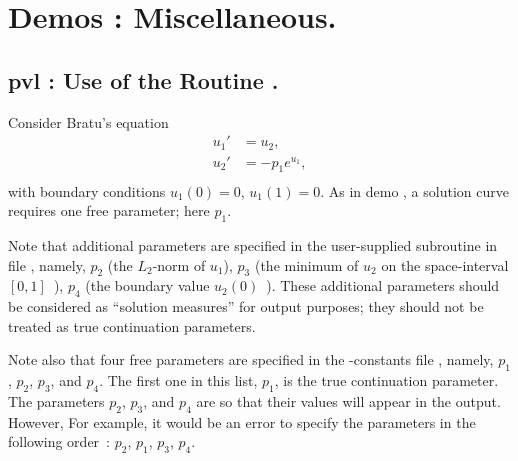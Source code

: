 \documentclass[12pt]{report}
\begin{document}
\chapter{ \AUTO Demos : Miscellaneous.} \label{ch:Demos_Misc}

\newpage
\section{ pvl : Use of the Routine .} \label{sec:Demos_pvl}

Consider Bratu's equation
\begin{equation} \begin{array}{cl}
  u_1 ' &= u_2  ,  \\
  u_2 ' &= -p_1  e^{u_1} , \\ 
\end{array} \end{equation}
with boundary conditions $ u_1(0)=0$, $u_1(1)=0.$
As in demo , a solution curve requires one free parameter;
here $p_1$.

Note that additional parameters are specified in the user-supplied subroutine 
 in file , namely,
$p_2$ (the $L_2$-norm of $u_1$),
$p_3$ (the minimum of $u_2$ on the space-interval $[0,1]$~),
$p_4$ (the boundary value $u_2(0)$~).
These additional parameters should be considered as ``solution measures''
for output purposes; they should not be treated as true
continuation parameters.

Note also that four free parameters are specified in the \AUTO-constants file 
, namely, $p_1$, $p_2$, $p_3$, and $p_4$.
The first one in this list, $p_1$, is the true continuation parameter. 
The parameters $p_2$, $p_3$, and $p_4$ are 
so that their values will appear in the output.
However, 
For example, it would be an error to specify the parameters
in the following order~: $p_2$, $p_1$, $p_3$, $p_4$.
\end{document}
